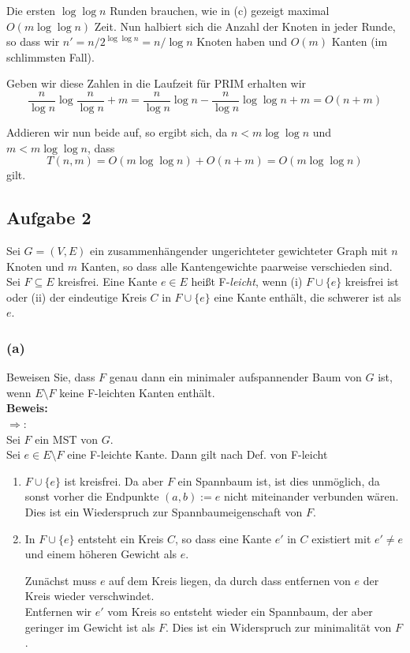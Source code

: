 \documentclass[11pt,a4paper,ngerman]{article}
\begin{document}
Die ersten $\log \log n$ Runden brauchen, wie in (c) gezeigt
maximal $O(m \log \log n)$ Zeit.
Nun halbiert sich die Anzahl der Knoten in jeder Runde, so dass wir
$n' = n / 2^{\log \log n} = n / \log n$ Knoten haben und $O(m)$ Kanten (im schlimmsten Fall).

Geben wir diese Zahlen in die Laufzeit für PRIM erhalten wir
$$
   \frac{n}{\log n} \log \frac{n}{\log n} + m = \frac{n}{\log n} \log n - \frac{n}{\log n} \log\log n + m = O(n + m)
$$

Addieren wir nun beide auf, so ergibt sich, da $n < m \log \log n$ und $m < m\log \log n$,
dass
$$
    T(n,m) = O(m \log \log n) + O(n + m) = O(m \log \log n)
$$
gilt.

\subsection*{Aufgabe 2}

Sei $G=(V,E)$ ein zusammenhängender ungerichteter gewichteter Graph mit $n$ Knoten
 und $m$ Kanten, so dass alle Kantengewichte paarweise verschieden sind.
Sei $F \subseteq E$ kreisfrei. Eine Kante $e \in E$ heißt F-\emph{leicht}, wenn
(i) $F \cup \{ e \}$ kreisfrei ist oder (ii) der eindeutige Kreis $C$ in $F \cup \{ e \}$ eine Kante enthält, die schwerer ist als $e$.

\subsubsection*{(a)}

Beweisen Sie, dass $F$ genau dann ein minimaler aufspannender Baum von $G$ ist, wenn $E \setminus F$ keine F-leichten Kanten enthält.\\

\textbf{Beweis:}\\

$\Rightarrow$:\\

Sei $F$ ein MST von $G$.\\
Sei $e \in E \setminus F$ eine F-leichte Kante. Dann gilt nach Def. von F-leicht
\begin{enumerate}[(1)]
    \item $F \cup \{ e \}$ ist kreisfrei. Da aber $F$ ein Spannbaum ist, ist dies unmöglich,
        da sonst vorher die Endpunkte $(a,b) := e$ nicht miteinander verbunden wären. Dies
        ist ein Wiederspruch zur Spannbaumeigenschaft von $F$.
    \item In $F \cup \{ e \}$ entsteht ein Kreis $C$, so dass eine Kante $e'$ in $C$ existiert mit $e' \not= e$ und
        einem höheren Gewicht als $e$.

        Zunächst muss $e$ auf dem Kreis liegen, da durch dass entfernen von $e$ der Kreis wieder verschwindet.\\
        Entfernen wir $e'$ vom Kreis so entsteht wieder ein Spannbaum, der aber geringer im Gewicht ist als
        $F$. Dies ist ein Widerspruch zur minimalität von $F$.
\end{enumerate}
\end{document}
